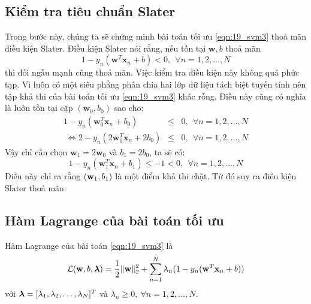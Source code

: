 \subsection{Kiểm tra tiêu chuẩn Slater}
Trong bước này, chúng ta sẽ chứng minh
bài toán tối ưu \eqref{eqn:19_svm3} thoả mãn điều kiện Slater. Điều kiện Slater
nói rằng, nếu tồn tại $\mathbf{w}, b$ thoả mãn  \begin{equation*}  1 -
y_n(\mathbf{w}^T\mathbf{x}_n + b) < 0, ~~\forall n = 1, 2, \dots, N
\end{equation*}  thì đối ngẫu mạnh cũng thoả mãn.
Việc kiểm tra điều kiện này không quá phức tạp. Vì luôn có một siêu
phẳng phân chia hai lớp dữ liệu tách biệt tuyến tính nên tập khả thi của bài toán tối ưu
\eqref{eqn:19_svm3} khác rỗng. Điều này cũng có nghĩa là luôn tồn tại cặp $(\mathbf{w}_0,
b_0)$ sao cho:
\begin{eqnarray}  1 - y_n(\mathbf{w}_0^T\mathbf{x}_n + b_0)
&\leq& 0, ~~\forall n = 1, 2, \dots, N \\\  \Leftrightarrow 2 -
y_n(2\mathbf{w}_0^T\mathbf{x}_n + 2b_0) &\leq& 0, ~~\forall n = 1, 2, \dots, N
\end{eqnarray}
Vậy chỉ cần chọn $\mathbf{w}_1 = 2\mathbf{w}_0$ và $b_1 = 2b_0$, ta sẽ có:
\begin{equation*}
1 - y_n(\mathbf{w}_1^T\mathbf{x}_n + b_1) \leq -1 < 0, ~~\forall n = 1, 2, \dots, N
\end{equation*}
Điều này chỉ ra rằng $(\mathbf{w}_1, b_1)$ là một điểm khả thi chặt. Từ đó suy ra điều kiện Slater thoả mãn.


\subsection{Hàm Lagrange của bài toán tối ưu}
Hàm Lagrange của bài toán \eqref{eqn:19_svm3} là
\begin{equation}
\label{eqn:19_svm4}
\mathcal{L}(\mathbf{w}, b, \boldsymbol{\lambda}) = \frac{1}{2} \|\mathbf{w}\|_2^2 +
\sum_{n=1}^N \lambda_n(1 - y_n(\mathbf{w}^T\mathbf{x}_n + b) )
\end{equation}
với $\boldsymbol{\lambda} = [\lambda_1, \lambda_2, \dots, \lambda_N]^T$ và $\lambda_n \geq
0, ~\forall n = 1, 2, \dots, N$.

